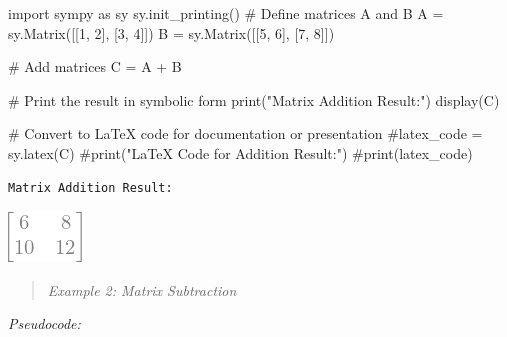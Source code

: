 \documentclass[
  letterpaper,
  DIV=11,
  numbers=noendperiod]{scrreprt}
\newenvironment{Shaded}{\begin{snugshade}}{\end{snugshade}}
\newcommand{\BuiltInTok}[1]{\textcolor[rgb]{0.00,0.23,0.31}{#1}}
\newcommand{\CommentTok}[1]{\textcolor[rgb]{0.37,0.37,0.37}{#1}}
\newcommand{\DecValTok}[1]{\textcolor[rgb]{0.68,0.00,0.00}{#1}}
\newcommand{\ImportTok}[1]{\textcolor[rgb]{0.00,0.46,0.62}{#1}}
\newcommand{\NormalTok}[1]{\textcolor[rgb]{0.00,0.23,0.31}{#1}}
\newcommand{\OperatorTok}[1]{\textcolor[rgb]{0.37,0.37,0.37}{#1}}
\newcommand{\StringTok}[1]{\textcolor[rgb]{0.13,0.47,0.30}{#1}}
\theoremstyle{plain}
\theoremstyle{definition}
\theoremstyle{remark}
\begin{document}
\begin{Shaded}
\begin{Highlighting}[]
\ImportTok{import}\NormalTok{ sympy }\ImportTok{as}\NormalTok{ sy}
\NormalTok{sy.init\_printing()}
\CommentTok{\# Define matrices A and B}
\NormalTok{A }\OperatorTok{=}\NormalTok{ sy.Matrix([[}\DecValTok{1}\NormalTok{, }\DecValTok{2}\NormalTok{], [}\DecValTok{3}\NormalTok{, }\DecValTok{4}\NormalTok{]])}
\NormalTok{B }\OperatorTok{=}\NormalTok{ sy.Matrix([[}\DecValTok{5}\NormalTok{, }\DecValTok{6}\NormalTok{], [}\DecValTok{7}\NormalTok{, }\DecValTok{8}\NormalTok{]])}

\CommentTok{\# Add matrices}
\NormalTok{C }\OperatorTok{=}\NormalTok{ A }\OperatorTok{+}\NormalTok{ B}

\CommentTok{\# Print the result in symbolic form}
\BuiltInTok{print}\NormalTok{(}\StringTok{"Matrix Addition Result:"}\NormalTok{)}
\NormalTok{display(C)}

\CommentTok{\# Convert to LaTeX code for documentation or presentation}
\CommentTok{\#latex\_code = sy.latex(C)}
\CommentTok{\#print("LaTeX Code for Addition Result:")}
\CommentTok{\#print(latex\_code)}
\end{Highlighting}
\end{Shaded}

\begin{verbatim}
Matrix Addition Result:
\end{verbatim}

\includegraphics{module_1_files/figure-pdf/cell-3-output-2.png}

\begin{quote}
\emph{Example 2: Matrix Subtraction}
\end{quote}

\emph{Pseudocode:}
\end{document}
